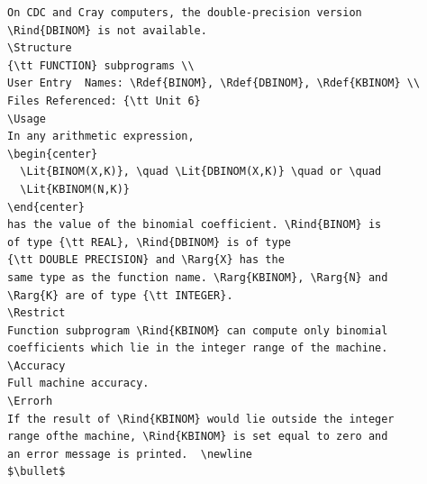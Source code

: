 \documentclass[a4paper,11pt]{cernman}
\begin{document}
{\begin{sideways}
\begin{minipage}[b]{\textheight}
\begin{minipage}[b]{.49\textwidth}
\begin{verbatim}
On CDC and Cray computers, the double-precision version
\Rind{DBINOM} is not available.
\Structure
{\tt FUNCTION} subprograms \\ 
User Entry  Names: \Rdef{BINOM}, \Rdef{DBINOM}, \Rdef{KBINOM} \\ 
Files Referenced: {\tt Unit 6}
\Usage
In any arithmetic expression,
\begin{center}
  \Lit{BINOM(X,K)}, \quad \Lit{DBINOM(X,K)} \quad or \quad
  \Lit{KBINOM(N,K)}
\end{center}
has the value of the binomial coefficient. \Rind{BINOM} is 
of type {\tt REAL}, \Rind{DBINOM} is of type 
{\tt DOUBLE PRECISION} and \Rarg{X} has the
same type as the function name. \Rarg{KBINOM}, \Rarg{N} and 
\Rarg{K} are of type {\tt INTEGER}.
\Restrict
Function subprogram \Rind{KBINOM} can compute only binomial
coefficients which lie in the integer range of the machine.
\Accuracy
Full machine accuracy.
\Errorh
If the result of \Rind{KBINOM} would lie outside the integer 
range ofthe machine, \Rind{KBINOM} is set equal to zero and 
an error message is printed.  \newline
$\bullet$
\end{verbatim}
\end{minipage}
\hfill
\begin{minipage}[b]{.49\textwidth}

\end{minipage}
\end{minipage}
\end{sideways}}
\end{document}

